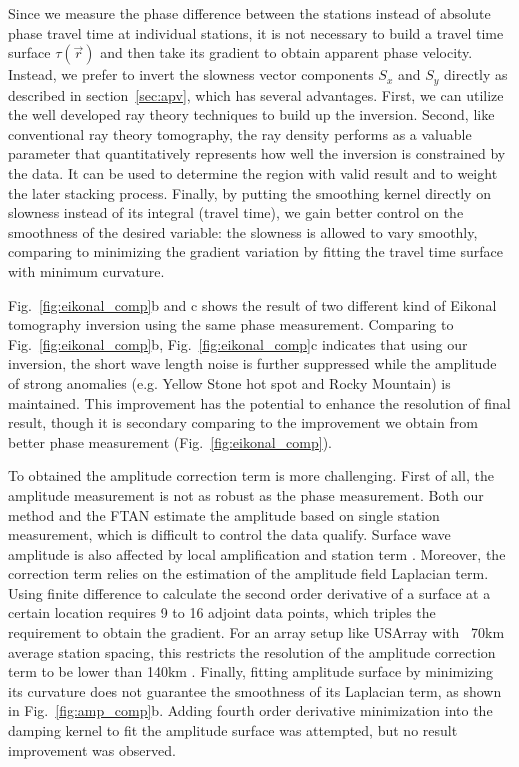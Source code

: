 \documentclass[referee]{gji}
\begin{document}
Since we measure the phase difference between the stations instead of absolute phase travel time at individual stations, it is not necessary to build a travel time surface $\tau(\vec{r})$ and then take its gradient to obtain apparent phase velocity. Instead, we prefer to invert the slowness vector components $S_x$ and $S_y$ directly as described in section~\ref{sec:apv}, which has several advantages. First, we can utilize the  well developed ray theory techniques to build up the inversion. Second, like conventional ray theory tomography, the ray density performs as a valuable parameter that quantitatively represents how well the inversion is constrained by the data. It can be used to determine the region with valid result and to weight the later stacking process. Finally, by putting the smoothing kernel directly on slowness instead of its integral (travel time), we gain better control on the smoothness of the desired variable: the slowness is allowed to vary smoothly, comparing to minimizing the gradient variation by fitting the travel time surface with minimum curvature. 

Fig.~\ref{fig:eikonal_comp}b and c shows the result of two different kind of Eikonal tomography inversion using the same phase measurement. Comparing to Fig.~\ref{fig:eikonal_comp}b, Fig.~\ref{fig:eikonal_comp}c indicates that using our inversion, the short wave length noise is further suppressed while the amplitude of strong anomalies (e.g. Yellow Stone hot spot and Rocky Mountain) is maintained. This improvement has the potential to enhance the resolution of final result, though it is secondary comparing to the improvement we obtain from better phase measurement (Fig.~\ref{fig:eikonal_comp}). 

To obtained the amplitude correction term is more challenging. First of all, the amplitude measurement is not as robust as the phase measurement. Both our method and the FTAN estimate the amplitude based on single station measurement, which is difficult to control the data qualify. Surface wave amplitude is also affected by local amplification and station term \cite{Lin:2012la,Eddy:2013la}. Moreover, the correction term  relies on the estimation of the amplitude field Laplacian term. Using finite difference to calculate the second order derivative of a surface at a certain location requires 9 to 16 adjoint data points, which triples the requirement to obtain the gradient. For an array setup like USArray with ~70km average station spacing, this restricts the resolution of the amplitude correction term to be lower than 140km \cite{Lin:2011fw}. Finally, fitting amplitude surface by minimizing its curvature does not guarantee the smoothness of its Laplacian term, as shown in Fig.~\ref{fig:amp_comp}b. Adding fourth order derivative minimization into the damping kernel to fit the amplitude surface was attempted, but no result improvement was observed.
\end{document}
